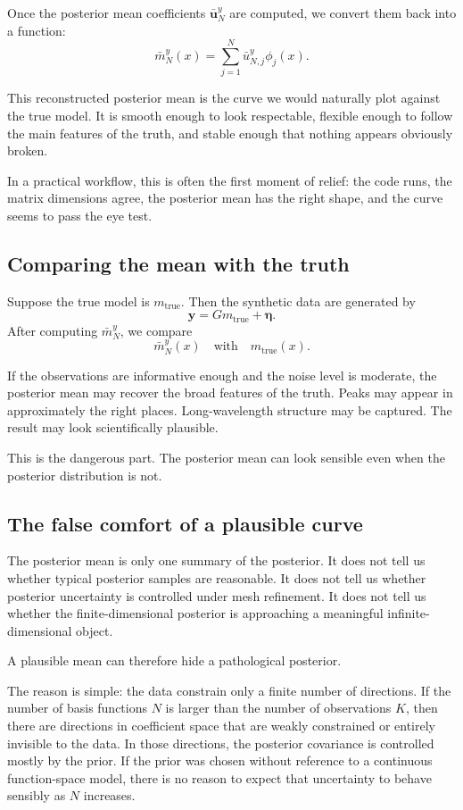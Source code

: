\documentclass[11pt,a4paper]{book}
\newcommand{\G}{G}
\begin{document}
Once the posterior mean coefficients $\bar{\bm{u}}_N^y$ are computed, we convert
them back into a function:
\[
    \bar{m}_N^y(x)
    =
    \sum_{j=1}^N
    \bar{u}_{N,j}^y \phi_j(x).
\]

This reconstructed posterior mean is the curve we would naturally plot against
the true model. It is smooth enough to look respectable, flexible enough to
follow the main features of the truth, and stable enough that nothing appears
obviously broken.

In a practical workflow, this is often the first moment of relief: the code
runs, the matrix dimensions agree, the posterior mean has the right shape, and
the curve seems to pass the eye test.

\subsection{Comparing the mean with the truth}

Suppose the true model is $m_{\mathrm{true}}$. Then the synthetic data are
generated by
\[
    \bm{y}
    =
    \G m_{\mathrm{true}}
    +
    \bm{\eta}.
\]
After computing $\bar{m}_N^y$, we compare
\[
    \bar{m}_N^y(x)
    \quad
    \text{with}
    \quad
    m_{\mathrm{true}}(x).
\]

If the observations are informative enough and the noise level is moderate, the
posterior mean may recover the broad features of the truth. Peaks may appear in
approximately the right places. Long-wavelength structure may be captured.
The result may look scientifically plausible.

This is the dangerous part. The posterior mean can look sensible even when the
posterior distribution is not.

\subsection{The false comfort of a plausible curve}

The posterior mean is only one summary of the posterior. It does not tell us
whether typical posterior samples are reasonable. It does not tell us whether
posterior uncertainty is controlled under mesh refinement. It does not tell us
whether the finite-dimensional posterior is approaching a meaningful
infinite-dimensional object.

A plausible mean can therefore hide a pathological posterior.

The reason is simple: the data constrain only a finite number of directions. If
the number of basis functions $N$ is larger than the number of observations $K$,
then there are directions in coefficient space that are weakly constrained or
entirely invisible to the data. In those directions, the posterior covariance is
controlled mostly by the prior. If the prior was chosen without reference to a
continuous function-space model, there is no reason to expect that uncertainty
to behave sensibly as $N$ increases.
\end{document}
